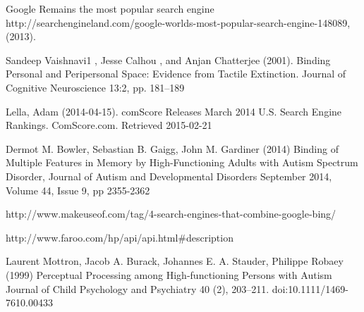 \documentclass[10pt]{article}
\begin{document}
\begin{thebibliography}{100}
Google Remains the most popular search engine http://searchengineland.com/google-worlds-most-popular-search-engine-148089, (2013).  


Sandeep Vaishnavi1 , Jesse Calhou , and Anjan Chatterjee (2001). Binding Personal and Peripersonal Space: Evidence from Tactile Extinction. Journal of Cognitive Neuroscience 13:2, pp. 181–189


Lella, Adam (2014-04-15). comScore Releases March 2014 U.S. Search Engine Rankings. ComScore.com. Retrieved 2015-02-21

Dermot M. Bowler, Sebastian B. Gaigg, John M. Gardiner (2014) Binding of Multiple Features in Memory by High-Functioning Adults with Autism Spectrum Disorder, Journal of Autism and Developmental Disorders September 2014, Volume 44, Issue 9, pp 2355-2362


 http://www.makeuseof.com/tag/4-search-engines-that-combine-google-bing/


http://www.faroo.com/hp/api/api.html\#description

 Laurent Mottron, Jacob A. Burack, Johannes E. A. Stauder, Philippe Robaey (1999) Perceptual Processing among High-functioning Persons with Autism Journal of Child Psychology and Psychiatry 40 (2), 203–211. doi:10.1111/1469-7610.00433

\end{thebibliography}
\end{document}
